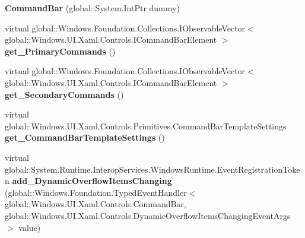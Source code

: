 \begin{DoxyCompactItemize}
\item 
\mbox{\label{class_windows_1_1_u_i_1_1_xaml_1_1_controls_1_1_command_bar_a9a0fc839b78496edf0afaebb86ed91bb}} 
{\bfseries Command\+Bar} (global\+::\+System.\+Int\+Ptr dummy)
\item 
\mbox{\label{class_windows_1_1_u_i_1_1_xaml_1_1_controls_1_1_command_bar_ae88ea6c40bfe9ef1b7d7ddbc13b1f9b9}} 
virtual global\+::\+Windows.\+Foundation.\+Collections.\+I\+Observable\+Vector$<$ global\+::\+Windows.\+U\+I.\+Xaml.\+Controls.\+I\+Command\+Bar\+Element $>$ {\bfseries get\+\_\+\+Primary\+Commands} ()
\item 
\mbox{\label{class_windows_1_1_u_i_1_1_xaml_1_1_controls_1_1_command_bar_a072695ed5c57aaec6c85a771fab759a9}} 
virtual global\+::\+Windows.\+Foundation.\+Collections.\+I\+Observable\+Vector$<$ global\+::\+Windows.\+U\+I.\+Xaml.\+Controls.\+I\+Command\+Bar\+Element $>$ {\bfseries get\+\_\+\+Secondary\+Commands} ()
\item 
\mbox{\label{class_windows_1_1_u_i_1_1_xaml_1_1_controls_1_1_command_bar_a3c347a4844a2ab249e968e1e53766ab0}} 
virtual global\+::\+Windows.\+U\+I.\+Xaml.\+Controls.\+Primitives.\+Command\+Bar\+Template\+Settings {\bfseries get\+\_\+\+Command\+Bar\+Template\+Settings} ()
\item 
\mbox{\label{class_windows_1_1_u_i_1_1_xaml_1_1_controls_1_1_command_bar_a1a44ae0c71e258f2cf660c142388ef5a}} 
virtual global\+::\+System.\+Runtime.\+Interop\+Services.\+Windows\+Runtime.\+Event\+Registration\+Token {\bfseries add\+\_\+\+Dynamic\+Overflow\+Items\+Changing} (global\+::\+Windows.\+Foundation.\+Typed\+Event\+Handler$<$ global\+::\+Windows.\+U\+I.\+Xaml.\+Controls.\+Command\+Bar, global\+::\+Windows.\+U\+I.\+Xaml.\+Controls.\+Dynamic\+Overflow\+Items\+Changing\+Event\+Args $>$ value)
\item 
\mbox{\label{class_windows_1_1_u_i_1_1_xaml_1_1_controls_1_1_command_bar_a0c78fff54eb4b6fe6739fa33dedab6f5}} 

\end{DoxyCompactItemize}
